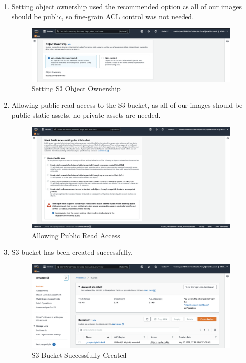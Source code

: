 \begin{enumerate}
    \item Setting object ownership used the recommended option as all of our images should be public, so fine-grain ACL control was not needed.
        \begin{figure}[H]
            \centering
            \includegraphics[width=\textwidth]{resources/s3/s3-object-ownership.png}
            \caption{Setting S3 Object Ownership}
            \label{fig:s3-object-ownership}
        \end{figure}


    \item Allowing public read access to the S3 bucket, as all of our images should be public static assets, no private assets are needed.
        \begin{figure}[H]
            \centering
            \includegraphics[width=\textwidth]{resources/s3/s3-public-access.png}
            \caption{Allowing Public Read Access}
            \label{fig:s3-public-access}
        \end{figure}


    \item S3 bucket has been created successfully.
        \begin{figure}[H]
            \centering
            \includegraphics[width=\textwidth]{resources/s3/s3-created.png}
            \caption{S3 Bucket Successfully Created}
            \label{fig:s3-created}
        \end{figure}



\end{enumerate}
